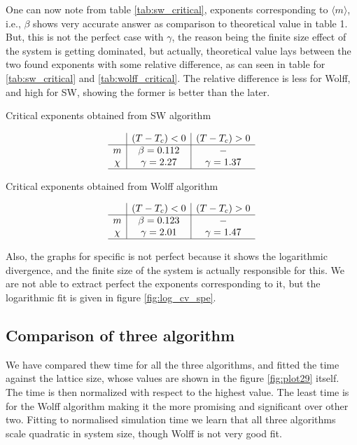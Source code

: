 \documentclass[a4paper,8pt]{article}
\begin{document}
One can now note from table \ref{tab:sw_critical}, exponents corresponding to $\langle m \rangle$, i.e., $\beta$ shows very accurate answer as comparison to theoretical value in table 1. But, this is not the perfect case with $\gamma$, the reason being the finite size effect of the system is getting dominated, but actually, theoretical value lays between the two found exponents with some relative difference, as can seen in table for \ref{tab:sw_critical} and \ref{tab:wolff_critical}. The relative difference is less for Wolff, and high for SW, showing the former is better than the later.

\begin{table}[htbp]
\centering
\caption{Critical exponents obtained from SW algorithm}
\label{tab:sw_critical}
\[
\begin{array}{c|c|c} 
& (T-T_c)<0 & (T-T_c)>0 \\
\hline 
m & \beta=0.112 & - \\
\chi & \gamma=2.27 & \gamma=1.37 \\
\hline
\end{array}
\]
\end{table}

\begin{table}[htbp]
\centering
\caption{Critical exponents obtained from Wolff algorithm}
\label{tab:wolff_critical}
\[
\begin{array}{c|c|c} 
& \left(T-T_c\right)<0 & \left(T-T_c\right)>0 \\
\hline 
m & \beta=0.123 & - \\
\chi & \gamma=2.01 & \gamma=1.47 \\
\hline
\end{array}
\]
\end{table}

Also, the graphs for specific is not perfect because it shows the logarithmic divergence, and the finite size of the system is actually responsible for this. We are not able to extract perfect the exponents corresponding to it, but the logarithmic fit is given in figure \ref{fig:log_cv_spe}.

\subsection{Comparison of three algorithm}
We have compared thew time for all the three algorithms, and fitted the time against the lattice size, whose values are shown in the figure \ref{fig:plot29} itself. The time is then normalized with respect to the highest value. The least time is for the Wolff algorithm making it the more promising and significant over other two. Fitting to normalised simulation time we learn that all three
algorithms scale quadratic in system size, though Wolff is not very good fit.
\end{document}
